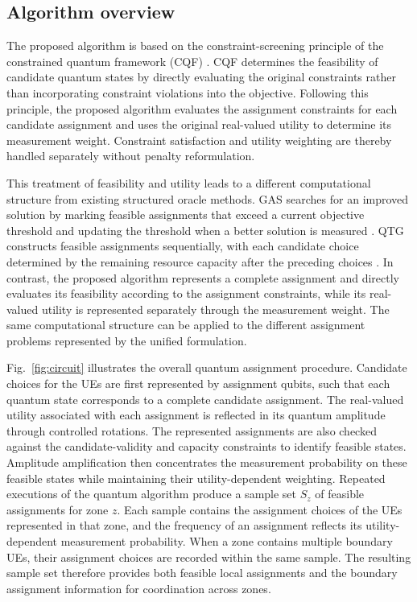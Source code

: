 \documentclass[journal]{IEEEtran}
\begin{document}
{{\subsection{Algorithm overview}
\label{sec:algorithm-overview}
The proposed algorithm is based on the constraint-screening principle of the constrained quantum framework (CQF) \cite{jang2025cqf}. 
CQF determines the feasibility of candidate quantum states by directly evaluating the original constraints rather than incorporating
constraint violations into the objective. Following this principle, the proposed algorithm evaluates the assignment constraints for each
candidate assignment and uses the original real-valued utility to determine its measurement weight. Constraint satisfaction and utility
weighting are thereby handled separately without penalty reformulation.

This treatment of feasibility and utility leads to a different computational structure from existing structured oracle methods. GAS
searches for an improved solution by marking feasible assignments that exceed a current objective threshold and updating the threshold when a
better solution is measured \cite{gilliam2021gas}. QTG constructs feasible assignments sequentially, with each candidate choice determined
by the remaining resource capacity after the preceding choices \cite{wilkening2025qtg}. In contrast, the proposed algorithm represents
a complete assignment and directly evaluates its feasibility according to the assignment constraints, while its real-valued utility is
represented separately through the measurement weight. The same computational structure can be applied to the different
assignment problems represented by the unified formulation.

Fig.~\ref{fig:circuit} illustrates the overall quantum assignment procedure. Candidate choices for the UEs are first represented by
assignment qubits, such that each quantum state corresponds to a complete candidate assignment. The real-valued utility associated with
each assignment is reflected in its quantum amplitude through controlled rotations. The represented assignments are also checked against the
candidate-validity and capacity constraints to identify feasible states. Amplitude amplification then concentrates the measurement probability
on these feasible states while maintaining their utility-dependent weighting.
Repeated executions of the quantum algorithm produce a sample set $S_z$ of feasible assignments for zone $z$. Each sample contains the
assignment choices of the UEs represented in that zone, and the frequency of an assignment reflects its utility-dependent measurement
probability. When a zone contains multiple boundary UEs, their assignment choices are recorded within the same sample. The resulting
sample set therefore provides both feasible local assignments and the boundary assignment information for coordination across zones.

}}
\end{document}
